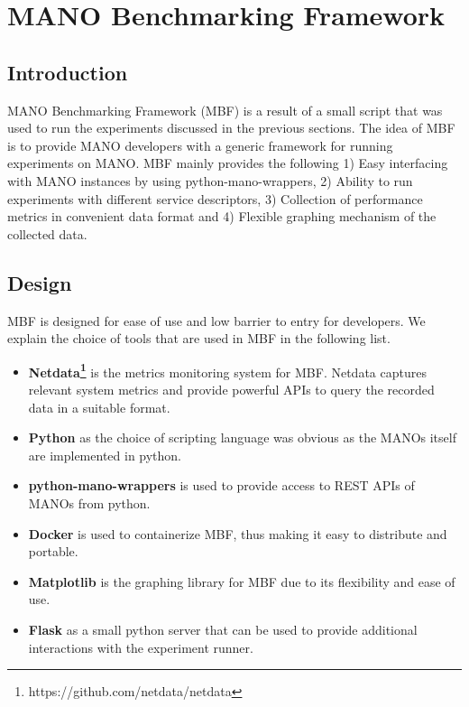 \section{MANO Benchmarking Framework} 

\subsection{Introduction}

MANO Benchmarking Framework (MBF) is a result of a small script that was used to run the experiments discussed in the previous sections. The idea of MBF is to provide MANO developers with a generic framework for running experiments on MANO. MBF mainly provides the following 1) Easy interfacing with MANO instances by using python-mano-wrappers, 2) Ability to run experiments with different service descriptors, 3) Collection of performance metrics in convenient data format and 4) Flexible graphing mechanism of the collected data. 

\subsection{Design}

MBF is designed for ease of use and low barrier to entry for developers. We explain the choice of tools that are used in MBF in the following list.

\begin{itemize}
	\item{\textbf{Netdata\footnote{https://github.com/netdata/netdata}}} is the metrics monitoring system for MBF. Netdata captures relevant system metrics and provide powerful APIs to query the recorded data in a suitable format.
	\item{\textbf{Python}} as the choice of scripting language was obvious as the MANOs itself are implemented in python.
	\item{\textbf{python-mano-wrappers}} is used to provide access to REST APIs of MANOs from python.
	\item{\textbf{Docker}} is used to containerize MBF, thus making it easy to distribute and portable.
	\item{\textbf{Matplotlib}} is the graphing library for MBF due to its flexibility and ease of use.
	\item{\textbf{Flask}} as a small python server that can be used to provide additional interactions with the experiment runner.

\end{itemize}

